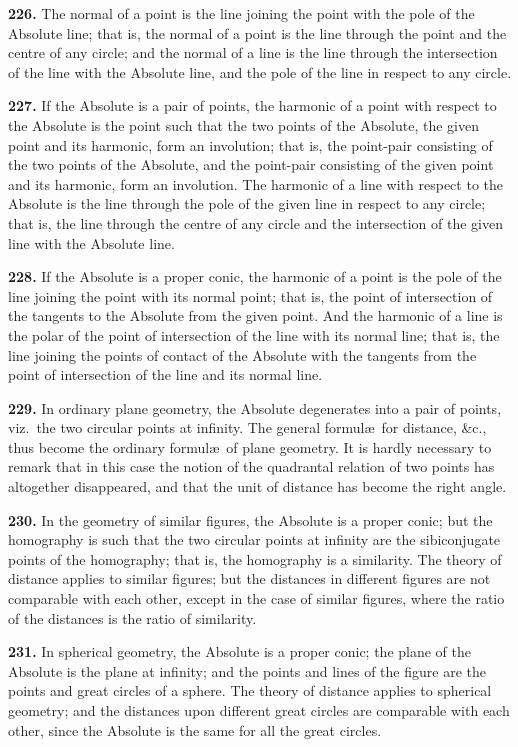 \documentclass[11pt,a4paper]{book}
\begin{document}
\begin{center}
\textbf{226.} The normal of a point is the line joining the point with the pole of the
Absolute line; that is, the normal of a point is the line through the point and the
centre of any circle; and the normal of a line is the line through the intersection of
the line with the Absolute line, and the pole of the line in respect to any circle.

\textbf{227.} If the Absolute is a pair of points, the harmonic of a point with respect to
the Absolute is the point such that the two points of the Absolute, the given point and
its harmonic, form an involution; that is, the point-pair consisting of the two points of
the Absolute, and the point-pair consisting of the given point and its harmonic, form
an involution. The harmonic of a line with respect to the Absolute is the line through
the pole of the given line in respect to any circle; that is, the line through the centre
of any circle and the intersection of the given line with the Absolute line.

\textbf{228.} If the Absolute is a proper conic, the harmonic of a point is the pole of
the line joining the point with its normal point; that is, the point of intersection of
the tangents to the Absolute from the given point. And the harmonic of a line is the
polar of the point of intersection of the line with its normal line; that is, the line
joining the points of contact of the Absolute with the tangents from the point of
intersection of the line and its normal line.

\textbf{229.} In ordinary plane geometry, the Absolute degenerates into a pair of points,
viz.\ the two circular points at infinity. The general formul\ae\ for distance, \&c.,
thus become the ordinary formul\ae\ of plane geometry. It is hardly necessary to
remark that in this case the notion of the quadrantal relation of two points has
altogether disappeared, and that the unit of distance has become the right angle.

\textbf{230.} In the geometry of similar figures, the Absolute is a proper conic; but the
homography is such that the two circular points at infinity are the sibiconjugate points
of the homography; that is, the homography is a similarity. The theory of distance
applies to similar figures; but the distances in different figures are not comparable with
each other, except in the case of similar figures, where the ratio of the distances is the
ratio of similarity.

\textbf{231.} In spherical geometry, the Absolute is a proper conic; the plane of the
Absolute is the plane at infinity; and the points and lines of the figure are the points
and great circles of a sphere. The theory of distance applies to spherical geometry;
and the distances upon different great circles are comparable with each other, since the
Absolute is the same for all the great circles.


\end{center}
\end{document}
